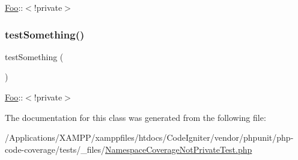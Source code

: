 \mbox{\hyperlink{class_foo}{Foo}}\+:\+:$<$!private$>$ \mbox{\label{class_namespace_coverage_not_private_test_a0fc4e17369bc9607ebdd850d9eda8167}} 
\subsubsection{\texorpdfstring{test\+Something()}{testSomething()}\hspace{0.1cm}{\footnotesize\ttfamily [2/2]}}
{\footnotesize\ttfamily test\+Something (\begin{DoxyParamCaption}{ }\end{DoxyParamCaption})}

\mbox{\hyperlink{class_foo}{Foo}}\+:\+:$<$!private$>$ 

The documentation for this class was generated from the following file\+:\begin{DoxyCompactItemize}
\item 
/\+Applications/\+X\+A\+M\+P\+P/xamppfiles/htdocs/\+Code\+Igniter/vendor/phpunit/php-\/code-\/coverage/tests/\+\_\+files/\mbox{\hyperlink{php-code-coverage_2tests_2__files_2_namespace_coverage_not_private_test_8php}{Namespace\+Coverage\+Not\+Private\+Test.\+php}}\end{DoxyCompactItemize}
